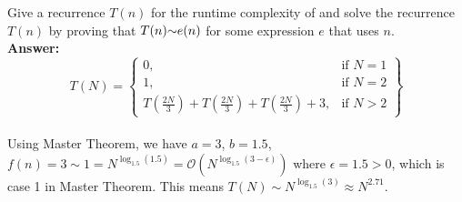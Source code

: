 \begin{problem}
\begin{questions}
\item Give a recurrence $T(n)$ for the runtime complexity of  and solve the recurrence $T(n)$ by proving that $T(n) \mathord{\sim}e(n)$ for some expression $e$ that uses $n$.\\
\textbf{Answer:}\\

\begin{equation}
    T(N) = 
    \left\{
        \begin{array}{lr}
            0, & \text{if } N = 1\\ 
            1, & \text{if } N = 2\\
            T(\frac{2N}{3}) + T(\frac{2N}{3}) + T(\frac{2N}{3}) + 3, & \text{if } N > 2 
        \end{array}
    \right\}
\end{equation} \\

Using Master Theorem, we have $a=3$, $b=1.5$, $f(n)=3 \sim 1=N^{\log_{1.5}(1.5)}=\mathcal{O}(N^{\log_{1.5}(3-\epsilon)})$ where $\epsilon=1.5 > 0$, which is case 1 in Master Theorem. This means $T(N) \sim N^{\log_{1.5}(3)} \approx N^{2.71}$.

\end{questions}
\end{problem}

